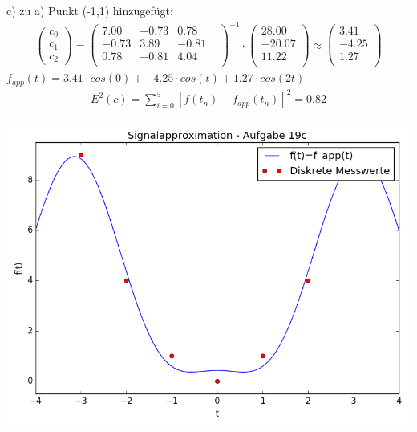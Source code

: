 	c) \newline
	zu a) Punkt (-1,1) hinzugefügt: \newline
	\begin{align*}
	\left(\begin{matrix}c_0\\c_1\\c_2\end{matrix}\right) =
	\left(\begin{matrix}
			7.00 & -0.73 & 0.78 & \\
			-0.73 & 3.89 & -0.81 & \\
			0.78 & -0.81 & 4.04 & \\
	\end{matrix}\right)^{-1} \cdot
	\left(\begin{matrix}
			28.00\\
			-20.07\\
			11.22\\
	\end{matrix}\right) \approx
	\left(\begin{matrix}
			3.41\\
			-4.25\\
			1.27\\
	\end{matrix}\right)
	\end{align*}
	$f_{app}(t) = 3.41 \cdot cos(0) + -4.25 \cdot cos(t) + 1.27 \cdot cos(2t) $\begin{align*}
			E^2(c) = \sum_{i=0}^5 \left[ f(t_n) - f_{app}(t_n)\right]^2 = 0.82
	\end{align*}

	\includegraphics[scale=0.8]{A19c1.png}

